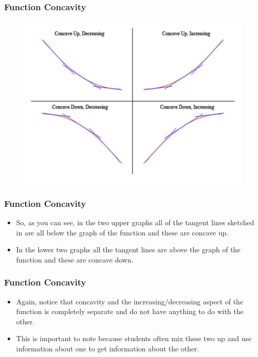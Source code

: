 \documentclass{beamer}
\begin{document}
\begin{frame} 
	\frametitle{Function Concavity}
	 \begin{figure}
\centering
\includegraphics[width=0.99\linewidth]{CurveSketchingGraphs1/Slide6}

\end{figure}

\end{frame}
\begin{frame} 
	\frametitle{Function Concavity}
\begin{itemize}
\item So, as you can see, in the two upper graphs all of the tangent lines sketched in are all below the graph of the function and these are concave up.  
\item In the lower two graphs all the tangent lines are above the graph of the function and these are concave down. 
\end{itemize}
\end{frame}
\begin{frame} 
	\frametitle{Function Concavity}
 \begin{itemize}
 \item Again, notice that concavity and the increasing/decreasing aspect of the function is completely separate and do not have anything to do with the other.  
 \item This is important to note because students often mix these two up and use information about one to get information about the other.
 \end{itemize}

\end{frame}
\end{document}
